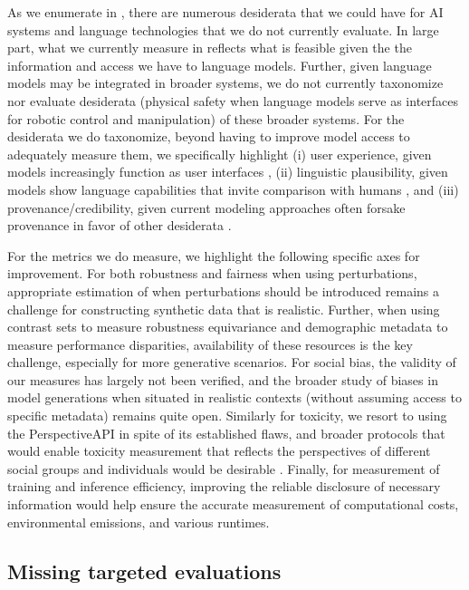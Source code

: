 As we enumerate in , there are numerous desiderata that we could have for AI systems and language technologies that we do not currently evaluate.
In large part, what we currently measure in \benchmarkname reflects what is feasible given the the information and access we have to language models.
Further, given language models may be integrated in broader systems, we do not currently taxonomize nor evaluate desiderata (\eg physical safety when language models serve as interfaces for robotic control and manipulation) of these broader systems. 
For the desiderata we do taxonomize, beyond having to improve model access to adequately measure them, we specifically highlight 
(i) user experience, given models increasingly function as user interfaces \citep[see][]{lee2022interaction},
(ii) linguistic plausibility, given models show language capabilities that invite comparison with humans \citep[see][]{linzen2020accelerate},
and (iii) provenance/credibility, given current modeling approaches often forsake provenance in favor of other desiderata \citep[see][]{metzler2021rethinking, khattab2021HAI}. 

For the metrics we do measure, we highlight the following specific axes for improvement.
For both robustness and fairness when using perturbations, appropriate estimation of when perturbations should be introduced \citep[see][]{dhole2021nl, ziems2022value} remains a challenge for constructing synthetic data that is realistic.
Further, when using contrast sets to measure robustness  equivariance and demographic metadata to measure performance disparities, availability of these resources is the key challenge, especially for more generative scenarios.
For social bias, the validity of our measures has largely not been verified, and the broader study of biases in model generations when situated in realistic contexts (\ie without assuming access to specific metadata) remains quite open.
Similarly for toxicity, we resort to using the PerspectiveAPI in spite of its established flaws, and broader protocols that would enable toxicity measurement that reflects the perspectives of different social groups and individuals would be desirable \citep{gordon2022jury}. 
Finally, for measurement of training and inference efficiency, improving the reliable disclosure of necessary information would help ensure the accurate measurement of computational costs, environmental emissions, and various runtimes.

\subsection{Missing targeted evaluations}
\label{sec:missing-targeted}

